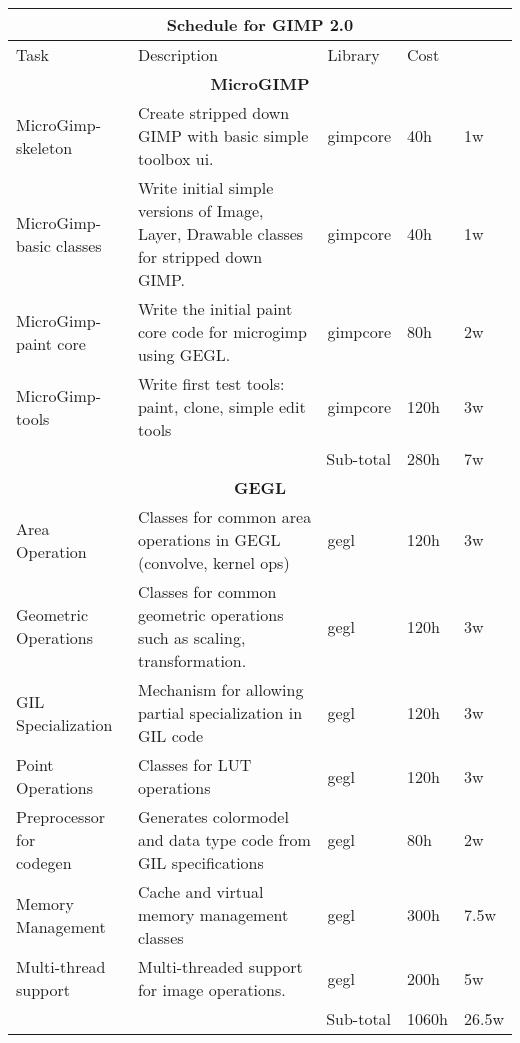 \begin{flushleft}		
\begin{tabular}{|p{2cm}|p{5cm}|p{2cm}|ll|}\hline
\multicolumn{5}{|c|}{\rule[-3mm]{0mm}{8mm} \large \bf Schedule for GIMP 2.0}\\  
\hline
Task & Description & Library & \multicolumn{2}{|l|}{Cost}\\ 
\hline 

\multicolumn{5}{|c|}{\bf MicroGIMP}\\
\hline
MicroGimp-skeleton & Create stripped down GIMP with basic simple
toolbox ui. & gimpcore & 40h & 1w\\
\hline
MicroGimp-basic classes & Write initial simple versions of Image,
Layer, Drawable classes for stripped down GIMP. & gimpcore & 40h & 1w\\
\hline
MicroGimp-paint core & Write the initial paint core code for microgimp
using GEGL. & gimpcore & 80h & 2w\\
\hline
MicroGimp-tools & Write first test tools: paint, clone, simple edit
tools  & gimpcore & 120h & 3w\\
\hline
\multicolumn{3}{|r|}{Sub-total} & 280h & 7w\\
\hline

\multicolumn{5}{|c|}{\bf GEGL}\\
\hline
\raggedright{Area\\ Operation} & Classes for common area operations in
GEGL (convolve, kernel ops) & gegl & 120h & 3w\\
\hline
\raggedright{Geometric\\ Operations} & Classes for common geometric
operations such as scaling, transformation. & gegl & 120h & 3w\\
\hline
\raggedright{GIL\\ Specialization} & Mechanism for allowing partial
specialization in GIL code & gegl & 120h & 3w\\
\hline
\raggedright{Point\\ Operations} & Classes for LUT operations & gegl &
120h & 3w\\
\hline
\raggedright{Preprocessor for\\ codegen} & Generates colormodel and
data type code from GIL specifications & gegl & 80h & 2w\\
\hline
\raggedright{Memory \\Management} & \raggedright{Cache and virtual
memory management classes} & gegl & 300h & 7.5w\\
\hline
\raggedright{Multi-thread \\support} & \raggedright{Multi-threaded
support for image operations.} & gegl & 200h & 5w\\  
\hline
\multicolumn{3}{|r|}{Sub-total} & 1060h & 26.5w\\
\hline


\end{tabular}
\end{flushleft}
